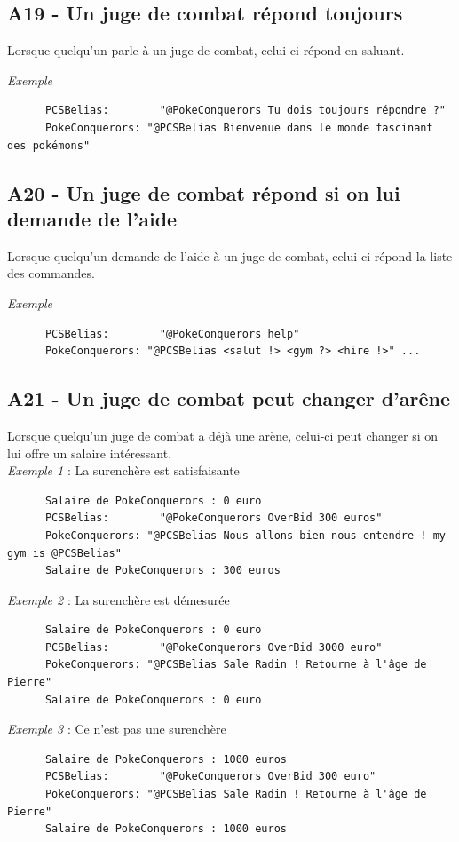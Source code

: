\documentclass[12pt]{article}
\begin{document}
\subsection{A19 - Un juge de combat répond toujours}

Lorsque quelqu'un parle à un juge de combat, celui-ci répond en saluant.\\

{\noindent \textit{Exemple}
\begin{verbatim}
      PCSBelias: 	    "@PokeConquerors Tu dois toujours répondre ?"
      PokeConquerors: "@PCSBelias Bienvenue dans le monde fascinant des pokémons"
\end{verbatim}

\subsection{A20 - Un juge de combat répond si on lui demande de l'aide}

Lorsque quelqu'un demande de l'aide à un juge de combat, celui-ci répond la liste des commandes.\\

{\noindent \textit{Exemple}
\begin{verbatim}
      PCSBelias: 	    "@PokeConquerors help"
      PokeConquerors: "@PCSBelias <salut !> <gym ?> <hire !>" ...
\end{verbatim}
\subsection{A21 - Un juge de combat peut changer d'arêne}

Lorsque quelqu'un juge de combat a déjà une arène, celui-ci peut changer si on lui offre un salaire intéressant.\\

{\noindent \textit{Exemple 1} : La surenchère est satisfaisante}

\begin{verbatim}
      Salaire de PokeConquerors : 0 euro
      PCSBelias: 	    "@PokeConquerors OverBid 300 euros"
      PokeConquerors: "@PCSBelias Nous allons bien nous entendre ! my gym is @PCSBelias"
      Salaire de PokeConquerors : 300 euros
\end{verbatim}
\textit{Exemple 2} : La surenchère est démesurée
\begin{verbatim}
      Salaire de PokeConquerors : 0 euro
      PCSBelias: 	    "@PokeConquerors OverBid 3000 euro"
      PokeConquerors: "@PCSBelias Sale Radin ! Retourne à l'âge de Pierre"
      Salaire de PokeConquerors : 0 euro
\end{verbatim}
\textit{Exemple 3} : Ce n'est pas une surenchère
\begin{verbatim}
      Salaire de PokeConquerors : 1000 euros
      PCSBelias: 	    "@PokeConquerors OverBid 300 euro"
      PokeConquerors: "@PCSBelias Sale Radin ! Retourne à l'âge de Pierre"
      Salaire de PokeConquerors : 1000 euros
\end{verbatim}
}}
\end{document}
